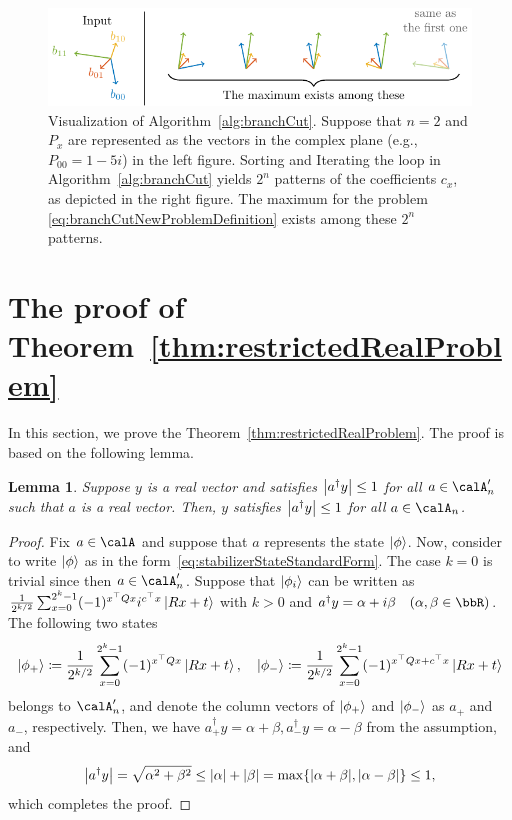 \documentclass[a4paper, onecolumn, 11pt, longbibliography]{quantumarticle}
\newcommand{\defeq}{\coloneqq}
\newtheorem{lemma}{Lemma}
\begin{document}
\begin{figure}[htbp]
  \centering
  \includegraphics[width=\columnwidth]{imgs/argsort.pdf}
  \caption{
    Visualization of Algorithm~\ref{alg:branchCut}.
    Suppose that $n=2$ and $P_x$ are represented as the vectors in the complex plane
    (e.g., $P_{00} = 1-5i$) in the left figure.
    Sorting and Iterating the loop in Algorithm~\ref{alg:branchCut}
    yields $2^n$ patterns of the coefficients $c_x$,
    as depicted in the right figure.
    The maximum for the problem \eqref{eq:branchCutNewProblemDefinition}
    exists among these $2^n$ patterns.
  }
  \label{fig:argsort}
\end{figure}

\section{The proof of Theorem~\ref{thm:restrictedRealProblem}}

In this section, we prove the Theorem~\ref{thm:restrictedRealProblem}.
The proof is based on the following lemma.
\begin{lemma}{\label{lem:absRealForTIsAbsRealForS}}
  Suppose $y$ is a real vector and satisfies
  $\abs{a^\dagger y} \leq 1$ for all $a \in \calA'_n$
  such that $a$ is a real vector.
  Then, $y$ satisfies
  $\abs{a^\dagger y} \leq 1$ for all $a \in \calA_n$.
\end{lemma}
\begin{proof}
  Fix $a \in \calA$ and suppose that $a$ represents
  the state $\ket{\phi}$.
  Now, consider to write $\ket{\phi}$ as in the form~\eqref{eq:stabilizerStateStandardForm}.
  The case $k=0$ is trivial since then $a \in \calA'_n$.
  Suppose that $\ket{\phi_i}$ can be written as
  $\frac{1}{2^{k/2}}\sum_{x=0}^{2^k-1} (-1)^{x^\top Q x} i^{c^\top x} \ket{Rx+t}$ with $k>0$
  and
  $a^\dagger y = \alpha + i\beta \quad (\alpha, \beta \in \bbR)$.
  The following two states
  \begin{equation*}
    \ket{\phi_+} \defeq \frac{1}{2^{k/2}}\sum_{x=0}^{2^k-1} (-1)^{x^\top Q x} \ket{Rx+t}, \quad
    \ket{\phi_-} \defeq \frac{1}{2^{k/2}}\sum_{x=0}^{2^k-1} (-1)^{x^\top Q x + c^\top x} \ket{Rx+t}
  \end{equation*}
  belongs to $\calA'_n$,
  and denote the column vectors of $\ket{\phi_+}$ and $\ket{\phi_-}$ as $a_+$ and $a_-$, respectively.
  Then, we have $a_+^\dagger y = \alpha+\beta, a_-^\dagger y = \alpha-\beta$
  from the assumption, and
  \begin{equation*}
    \abs{a^\dagger y}
    =\sqrt{\alpha^2 + \beta^2}
    \leq \abs{\alpha}+\abs{\beta}
    = \max\{\abs{\alpha+\beta}, \abs{\alpha-\beta}\}
    \leq 1,
  \end{equation*}
  which completes the proof.
\end{proof}
\end{document}
